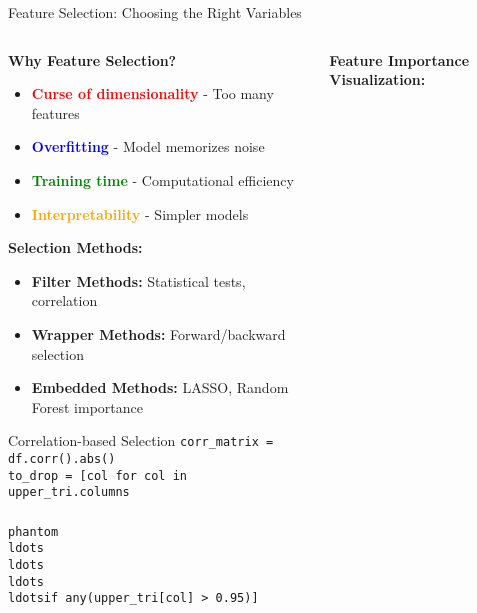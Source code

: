 \documentclass[8pt,aspectratio=1610]{beamer}
\begin{document}
\begin{frame}{Feature Selection: Choosing the Right Variables}
\begin{columns}[t]
\begin{column}{0.48\textwidth}
\textbf{Why Feature Selection?}
\begin{itemize}
\setlength{\itemsep}{1pt}
\item \textcolor{red}{\textbf{Curse of dimensionality}} - Too many features
\item \textcolor{blue}{\textbf{Overfitting}} - Model memorizes noise
\item \textcolor{green}{\textbf{Training time}} - Computational efficiency
\item \textcolor{orange}{\textbf{Interpretability}} - Simpler models
\end{itemize}

\vspace{0.3cm}
\textbf{Selection Methods:}
\begin{itemize}
\setlength{\itemsep}{1pt}
\item \textbf{Filter Methods:} Statistical tests, correlation
\item \textbf{Wrapper Methods:} Forward/backward selection
\item \textbf{Embedded Methods:} LASSO, Random Forest importance
\end{itemize}

\vspace{0.3cm}
\begin{block}{Correlation-based Selection}
\scriptsize
\texttt{corr\_matrix = df.corr().abs()} \\
\texttt{to\_drop = [col for col in upper\_tri.columns} \\
\texttt{\\phantom{\\ldots\\ldots\\ldots\\ldots}if any(upper\_tri[col] > 0.95)]}
\end{block}
\end{column}

\begin{column}{0.48\textwidth}
\textbf{Feature Importance Visualization:}
\vspace{0.2cm}

\end{column}
\end{columns}
\end{frame}
\end{document}
